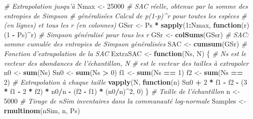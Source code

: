 \documentclass[
  11pt,
  french,
  a4paper,
  extrafontsizes,onecolumn,openright
  ]{memoir}
\newenvironment{Shaded}{\begin{snugshade}}{\end{snugshade}}
\newcommand{\CommentTok}[1]{\textcolor[rgb]{0.56,0.35,0.01}{\textit{#1}}}
\newcommand{\ControlFlowTok}[1]{\textcolor[rgb]{0.13,0.29,0.53}{\textbf{#1}}}
\newcommand{\DecValTok}[1]{\textcolor[rgb]{0.00,0.00,0.81}{#1}}
\newcommand{\KeywordTok}[1]{\textcolor[rgb]{0.13,0.29,0.53}{\textbf{#1}}}
\newcommand{\NormalTok}[1]{#1}
\newcommand{\OperatorTok}[1]{\textcolor[rgb]{0.81,0.36,0.00}{\textbf{#1}}}
\newcommand{\StringTok}[1]{\textcolor[rgb]{0.31,0.60,0.02}{#1}}
\begin{document}
\begin{Shaded}
\begin{Highlighting}[]
\CommentTok{# Extrapolation jusqu'à}
\NormalTok{Nmax <-}\StringTok{ }\DecValTok{25000}
\CommentTok{# SAC réelle, obtenue par la somme des entropies de Simpson}
\CommentTok{# généralisées Calcul de p(1-p)^r pour toutes les espèces}
\CommentTok{# (en lignes) et tous les r (en colonnes)}
\NormalTok{GSsr <-}\StringTok{ }\NormalTok{Ps }\OperatorTok{*}\StringTok{ }\KeywordTok{sapply}\NormalTok{(}\DecValTok{1}\OperatorTok{:}\NormalTok{Nmax, }\ControlFlowTok{function}\NormalTok{(r) (}\DecValTok{1} \OperatorTok{-}\StringTok{ }\NormalTok{Ps)}\OperatorTok{^}\NormalTok{r)}
\CommentTok{# Simpson généralisé pour tous les r}
\NormalTok{GSr <-}\StringTok{ }\KeywordTok{colSums}\NormalTok{(GSsr)}
\CommentTok{# SAC: somme cumulée des entropies de Simpson généralisées}
\NormalTok{SAC <-}\StringTok{ }\KeywordTok{cumsum}\NormalTok{(GSr)}
\CommentTok{# Fonction d'extrapolation de la SAC}
\NormalTok{ExtraSAC <-}\StringTok{ }\ControlFlowTok{function}\NormalTok{(Ns, N) \{}
    \CommentTok{# Ns est le vecteur des abondances de l'échantillon, N}
    \CommentTok{# est le vecteur des tailles à extrapoler}
\NormalTok{    n0 <-}\StringTok{ }\KeywordTok{sum}\NormalTok{(Ns)}
\NormalTok{    Sn0 <-}\StringTok{ }\KeywordTok{sum}\NormalTok{(Ns }\OperatorTok{>}\StringTok{ }\DecValTok{0}\NormalTok{)}
\NormalTok{    f1 <-}\StringTok{ }\KeywordTok{sum}\NormalTok{(Ns }\OperatorTok{==}\StringTok{ }\DecValTok{1}\NormalTok{)}
\NormalTok{    f2 <-}\StringTok{ }\KeywordTok{sum}\NormalTok{(Ns }\OperatorTok{==}\StringTok{ }\DecValTok{2}\NormalTok{)}
    \CommentTok{# Extrapolation à chaque taille}
    \KeywordTok{vapply}\NormalTok{(N, }\ControlFlowTok{function}\NormalTok{(n) Sn0 }\OperatorTok{+}\StringTok{ }\DecValTok{2} \OperatorTok{*}\StringTok{ }\NormalTok{f1 }\OperatorTok{-}\StringTok{ }\NormalTok{f2 }\OperatorTok{-}\StringTok{ }\NormalTok{(}\DecValTok{3} \OperatorTok{*}\StringTok{ }\NormalTok{f1 }\OperatorTok{-}\StringTok{ }\DecValTok{2} \OperatorTok{*}\StringTok{ }\NormalTok{f2) }\OperatorTok{*}
\StringTok{        }\NormalTok{n0}\OperatorTok{/}\NormalTok{n }\OperatorTok{-}\StringTok{ }\NormalTok{(f2 }\OperatorTok{-}\StringTok{ }\NormalTok{f1) }\OperatorTok{*}\StringTok{ }\NormalTok{(n0}\OperatorTok{/}\NormalTok{n)}\OperatorTok{^}\DecValTok{2}\NormalTok{, }\DecValTok{0}\NormalTok{)}
\NormalTok{\}}
\CommentTok{# Taille de l'échantillon}
\NormalTok{n <-}\StringTok{ }\DecValTok{5000}
\CommentTok{# Tirage de nSim inventaires dans la communauté log-normale}
\NormalTok{Samples <-}\StringTok{ }\KeywordTok{rmultinom}\NormalTok{(nSim, n, Ps)}

\end{Highlighting}
\end{Shaded}
\end{document}
